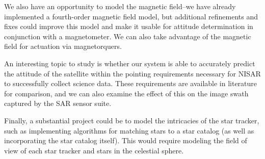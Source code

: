 We also have an opportunity to model the magnetic field–we have already implemented a fourth-order magnetic field model, but additional refinements and fixes could improve this model and make it usable for attitude determination in conjunction with a magnetometer. We can also take advantage of the magnetic field for actuation via magnetorquers.

An interesting topic to study is whether our system is able to accurately predict the attitude of the satellite within the pointing requirements necessary for NISAR to successfully collect science data. These requirements are available in literature for comparison, and we can also examine the effect of this on the image swath captured by the SAR sensor suite.

Finally, a substantial project could be to model the intricacies of the star tracker, such as implementing algorithms for matching stars to a star catalog (as well as incorporating the star catalog itself). This would require modeling the field of view of each star tracker and stars in the celestial sphere.